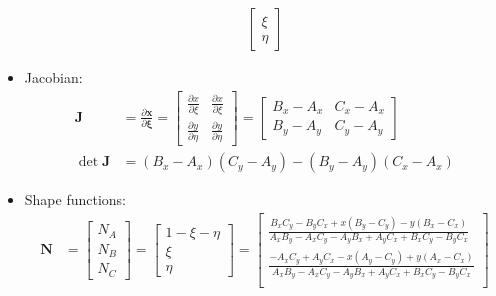 \documentclass[10pt]{article}
\begin{document}
\begin{itemize}
\begin{align}
            \begin{bmatrix}
                \xi \\
                \eta
            \end{bmatrix}
        \end{align}
    \item Jacobian:
        \begin{align}
            \mathbf{J} &= \frac{\partial \mathbf{x}}{\partial \boldsymbol{\xi}}
            =
            \begin{bmatrix}
                \frac{\partial x}{\partial \xi} & \frac{\partial x}{\partial \xi} \\
                \frac{\partial y}{\partial \eta} & \frac{\partial y}{\partial \eta}
            \end{bmatrix}
            =
            \begin{bmatrix}
                B_x - A_x & C_x - A_x \\
                B_y - A_y & C_y - A_y
            \end{bmatrix} \\
            \det \mathbf{J}
            &= (B_x - A_x)(C_y - A_y) - (B_y - A_y)(C_x - A_x)
        \end{align}
    \item Shape functions:
        \begin{align}
            \mathbf{N}
            &=
            \begin{bmatrix}
                N_A \\
                N_B \\
                N_C
            \end{bmatrix}
            =
            \begin{bmatrix}
                1- \xi - \eta \\
                \xi \\
                \eta
            \end{bmatrix}
            =
            \begin{bmatrix}
                \frac{B_{x} C_{y} - B_{y} C_{x} + x \left(B_{y} - C_{y}\right) - y \left(B_{x} - C_{x}\right)}{A_{x} B_{y} - A_{x} C_{y} - A_{y} B_{x} + A_{y} C_{x} + B_{x} C_{y} - B_{y} C_{x}} \\
                \frac{- A_{x} C_{y} + A_{y} C_{x} - x \left(A_{y} - C_{y}\right) + y \left(A_{x} - C_{x}\right)}{A_{x} B_{y} - A_{x} C_{y} - A_{y} B_{x} + A_{y} C_{x} + B_{x} C_{y} - B_{y} C_{x}} \\

\end{bmatrix}
\end{align}
\end{itemize}
\end{document}
